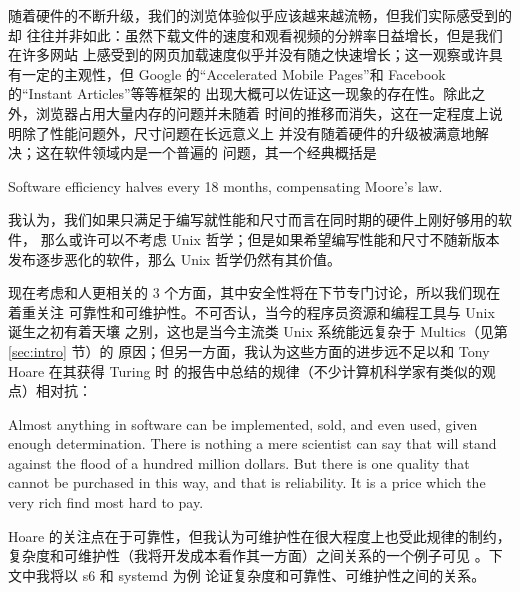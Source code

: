 随着硬件的不断升级，我们的浏览体验似乎应该越来越流畅，但我们实际感受到的却
往往并非如此：虽然下载文件的速度和观看视频的分辨率日益增长，但是我们在许多网站
上感受到的网页加载速度似乎并没有随之快速增长；这一观察或许具有一定的主观性，但
Google 的“Accelerated Mobile Pages”和 Facebook 的“Instant Articles”等等框架的
出现大概可以佐证这一现象的存在性。除此之外，浏览器占用大量内存的问题并未随着
时间的推移而消失，这在一定程度上说明除了性能问题外，尺寸问题在长远意义上
并没有随着硬件的升级被满意地解决；这在软件领域内是一个普遍的
问题，其一个经典概括是
\begin{quoting}
	Software efficiency halves every 18 months, compensating Moore's law.
\end{quoting}
我认为，我们如果只满足于编写就性能和尺寸而言在同时期的硬件上刚好够用的软件，
那么或许可以不考虑 Unix 哲学；但是如果希望编写性能和尺寸不随新版本
发布逐步恶化的软件，那么 Unix 哲学仍然有其价值。

现在考虑和人更相关的 3 个方面，其中安全性将在下节专门讨论，所以我们现在着重关注
可靠性和可维护性。不可否认，当今的程序员资源和编程工具与 Unix 诞生之初有着天壤
之别，这也是当今主流类 Unix 系统能远复杂于 Multics（见第 \ref{sec:intro} 节）的
原因；但另一方面，我认为这些方面的进步远不足以和 Tony Hoare 在其获得 Turing 时
的报告中总结的规律（不少计算机科学家有类似的观点）相对抗：
\begin{quoting}
	Almost anything in software can be implemented, sold, and even used, given
	enough determination.  There is nothing a mere scientist can say that will
	stand against the flood of a hundred million dollars.  But there is one
	quality that cannot be purchased in this way, and that is reliability.
	It is a price which the very rich find most hard to pay.
\end{quoting}
Hoare 的关注点在于可靠性，但我认为可维护性在很大程度上也受此规律的制约，
复杂度和可维护性（我将开发成本看作其一方面）之间关系的一个例子可见
\parencite{rbrander2017}。下文中我将以 s6 和 systemd 为例
论证复杂度和可靠性、可维护性之间的关系。

